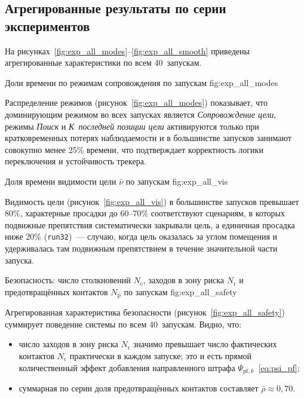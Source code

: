 \subsection{Агрегированные результаты по серии экспериментов}

На рисунках~\ref{fig:exp_all_modes}--\ref{fig:exp_all_smooth}
приведены агрегированные характеристики по всем 40~запускам.

{Доли времени по режимам сопровождения по запускам}
{fig:exp_all_modes}

Распределение режимов (рисунок~\ref{fig:exp_all_modes}) показывает,
что доминирующим режимом во всех запусках является
\textit{Сопровождение цели}, режимы \textit{Поиск} и
\textit{К~последней позиции цели} активируются только при
кратковременных потерях наблюдаемости и в большинстве запусков
занимают совокупно менее 25\% времени, что подтверждает корректность
логики переключения и устойчивость трекера.

{Доля времени видимости цели $\bar{\nu}$ по запускам}
{fig:exp_all_vis}

Видимость цели (рисунок~\ref{fig:exp_all_vis}) в большинстве запусков
превышает 80\%, характерные просадки до 60--70\% соответствуют
сценариям, в которых подвижные препятствия систематически
закрывали цель, а единичная просадка ниже 20\% (\texttt{run32})~---
случаю, когда цель оказалась за углом помещения и удерживалась там
подвижным препятствием в течение значительной части запуска.

{Безопасность: число столкновений $N_{\text{c}}$,
заходов в зону риска $N_{\text{r}}$ и предотвращённых
контактов $N_{\text{p}}$ по запускам}
{fig:exp_all_safety}

Агрегированная характеристика безопасности
(рисунок~\ref{fig:exp_all_safety}) суммирует поведение системы по
всем 40~запускам. Видно, что:
\begin{itemize}
    \item число заходов в зону риска $N_{\text{r}}$ значимо превышает
          число фактических контактов $N_{\text{c}}$ практически в
          каждом запуске; это и есть прямой количественный эффект
          добавления направленного штрафа
          $\Psi_{\text{pf},k}$~\eqref{eq:psi_pf};
    \item суммарная по серии доля предотвращённых контактов
          составляет $\bar{\rho} \approx 0{,}70$.
\end{itemize}

